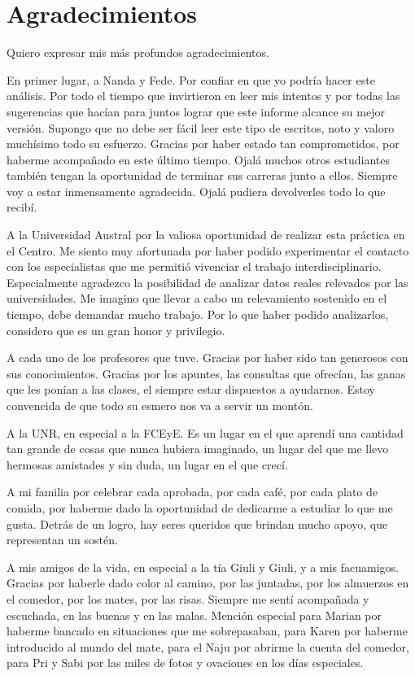 \documentclass[12pt]{article}
\begin{document}
\restoregeometry
  
\pagestyle{fancy}
\rhead{}

\section*{Agradecimientos}\label{agradecimientos}

Quiero expresar mis más profundos agradecimientos.

En primer lugar, a Nanda y Fede. Por confiar en que yo podría hacer este
análisis. Por todo el tiempo que invirtieron en leer mis intentos y por
todas las sugerencias que hacían para juntos lograr que este informe
alcance su mejor versión. Supongo que no debe ser fácil leer este tipo
de escritos, noto y valoro muchísimo todo su esfuerzo. Gracias por haber
estado tan comprometidos, por haberme acompañado en este último tiempo.
Ojalá muchos otros estudiantes también tengan la oportunidad de terminar
sus carreras junto a ellos. Siempre voy a estar inmensamente agradecida.
Ojalá pudiera devolverles todo lo que recibí.

A la Universidad Austral por la valiosa oportunidad de realizar esta
práctica en el Centro. Me siento muy afortunada por haber podido
experimentar el contacto con los especialistas que me permitió vivenciar
el trabajo interdisciplinario. Especialmente agradezco la posibilidad de
analizar datos reales relevados por las universidades. Me imagino que
llevar a cabo un relevamiento sostenido en el tiempo, debe demandar
mucho trabajo. Por lo que haber podido analizarlos, considero que es un
gran honor y privilegio.

A cada uno de los profesores que tuve. Gracias por haber sido tan
generosos con sus conocimientos. Gracias por los apuntes, las consultas
que ofrecían, las ganas que les ponían a las clases, el siempre estar
dispuestos a ayudarnos. Estoy convencida de que todo su esmero nos va a
servir un montón.

A la UNR, en especial a la FCEyE. Es un lugar en el que aprendí una
cantidad tan grande de cosas que nunca hubiera imaginado, un lugar del
que me llevo hermosas amistades y sin duda, un lugar en el que crecí.

A mi familia por celebrar cada aprobada, por cada café, por cada plato
de comida, por haberme dado la oportunidad de dedicarme a estudiar lo
que me gusta. Detrás de un logro, hay seres queridos que brindan mucho
apoyo, que representan un sostén.

A mis amigos de la vida, en especial a la tía Giuli y Giuli, y a mis
facuamigos. Gracias por haberle dado color al camino, por las juntadas,
por los almuerzos en el comedor, por los mates, por las risas. Siempre
me sentí acompañada y escuchada, en las buenas y en las malas. Mención
especial para Marian por haberme bancado en situaciones que me
sobrepasaban, para Karen por haberme introducido al mundo del mate, para
el Naju por abrirme la cuenta del comedor, para Pri y Sabi por las miles
de fotos y ovaciones en los días especiales.
\end{document}
